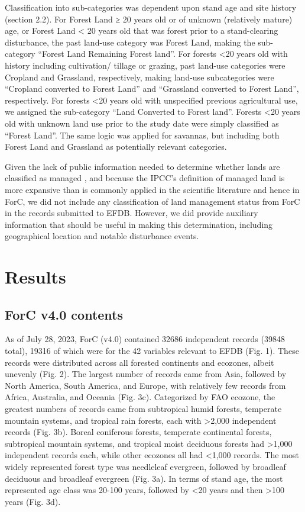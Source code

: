 \documentclass[, manuscript]{copernicus}
\begin{document}
Classification into sub-categories was dependent upon stand age and site
history (section 2.2). For Forest Land ≥ 20 years old or of unknown
(relatively mature) age, or Forest Land \textless{} 20 years old that
was forest prior to a stand-clearing disturbance, the past land-use
category was Forest Land, making the sub-category ``Forest Land
Remaining Forest land''. For forests \textless20 years old with history
including cultivation/ tillage or grazing, past land-use categories were
Cropland and Grassland, respectively, making land-use subcategories were
``Cropland converted to Forest Land'' and ``Grassland converted to
Forest Land'', respectively. For forests \textless20 years old with
unspecified previous agricultural use, we assigned the sub-category
``Land Converted to Forest land''. Forests \textless20 years old with
unknown land use prior to the study date were simply classified as
``Forest Land''. The same logic was applied for savannas, but including
both Forest Land and Grassland as potentially relevant categories.

Given the lack of public information needed to determine whether lands
are classified as managed
\citep{ogle_delineating_2018, deng_comparing_2021}, and because the
IPCC's definition of managed land is more expansive than is commonly
applied in the scientific literature and hence in ForC, we did not
include any classification of land management status from ForC in the
records submitted to EFDB. However, we did provide auxiliary information
that should be useful in making this determination, including
geographical location and notable disturbance events.

\section{Results}

\subsection{ForC v4.0 contents}

As of July 28, 2023, ForC (v4.0) contained 32686 independent records
(39848 total), 19316 of which were for the 42 variables relevant to EFDB
(Fig. 1). These records were distributed across all forested continents
and ecozones, albeit unevenly (Fig. 2). The largest number of records
came from Asia, followed by North America, South America, and Europe,
with relatively few records from Africa, Australia, and Oceania (Fig.
3c). Categorized by FAO ecozone, the greatest numbers of records came
from subtropical humid forests, temperate mountain systems, and tropical
rain forests, each with \textgreater2,000 independent records (Fig. 3b).
Boreal coniferous forests, temperate continental forests, subtropical
mountain systems, and tropical moist deciduous forests had
\textgreater1,000 independent records each, while other ecozones all had
\textless1,000 records. The most widely represented forest type was
needleleaf evergreen, followed by broadleaf deciduous and broadleaf
evergreen (Fig. 3a). In terms of stand age, the most represented age
class was 20-100 years, followed by \textless20 years and then
\textgreater100 years (Fig. 3d).
\end{document}

